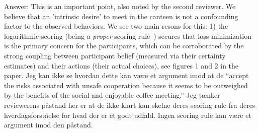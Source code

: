 \documentclass[a4paper]{article}
\newenvironment{robin}{\smallskip \noindent \color{red!10!green!50!blue}}{\color{black}\smallskip}
\newenvironment{tobo}{\smallskip \noindent \color{yellow!80!black!80}}{\color{black}\smallskip}
\begin{document}
\begin{itemize}
\begin{robin}
Answer: This is an important point, also noted by the second reviewer. We believe that an 'intrinsic desire' to meet in the canteen is not a confounding factor to the observed behaviors. We see two main resons for this: 1) the logarithmic scoring (being a \emph{proper} scoring rule~\cite{seidenfeld1985calibration, palfrey2009eliciting}) secures that loss minimization is the primary concern for the participants, which can be corroborated by the strong coupling between participant belief (measured via their certainty estimates) and their actions (their actual choices), see figures 1 and 2 in the paper. 
\begin{tobo}
Jeg kan ikke se hvordan dette kan være et argument imod at de ``accept the risks associated with unsafe cooperation because it seems to be outweighed by the benefits of the social and enjoyable coffee meeting.'' Jeg tænker reviewerens påstand her er at de ikke klart kan skelne deres scoring rule fra deres hverdagsforståelse for hvad der er et godt udfald. Ingen scoring rule kan være et argument imod den påstand.  
\end{tobo}

\end{robin}
\end{itemize}
\end{document}
